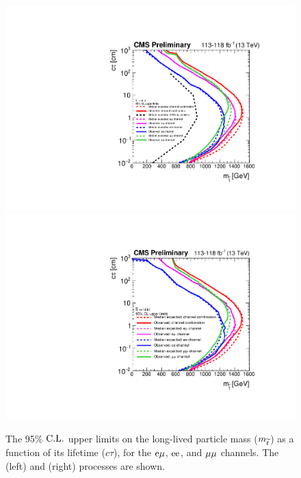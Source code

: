 \begin{figure}[hbtp]
\centering
\includegraphics[scale=0.39]{figures/results/2DlimitsStopToLB.pdf}
\includegraphics[scale=0.39]{figures/results/2DlimitsStopToLD.pdf}
\caption{The 95\% $\text{C.L.}$ upper limits on the long-lived particle mass ($m_{\widetilde{t}}$) as a function of its lifetime ($c\tau$), for the $\mathrm{e}{\mu}$, $\mathrm{e}\mathrm{e}$, and ${\mu}{\mu}$ channels. The \stoptolb (left) and \stoptold (right) processes are shown.} 
\label{limits_individual}
\end{figure}


